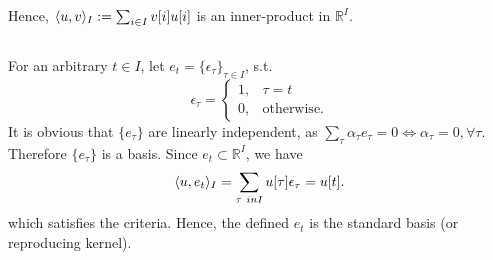 Hence, $\langle u, v \rangle_I := \sum_{i \in I} v[i]u[i]$ is an inner-product in $\mathbb{R}^I$.

\subsection{}\label{subsec:p4-f}
For an arbitrary $t \in I$, let $e_t = \{\epsilon_\tau\}_{\tau \in I}$, s.t.
\[
\epsilon_\tau = \begin{cases}
1, &\tau = t\\
0, &\text{otherwise}.
\end{cases}
\]
It is obvious that $\{e_\tau\}$ are linearly independent, as $\sum_{\tau} \alpha_\tau e_\tau = 0 \Leftrightarrow \alpha_\tau =0, \forall \tau$. Therefore $\{e_\tau\}$ is a basis. Since $e_t \subset \mathbb{R}^I$, we have
\[\innerprod{u}{e_t}_I = \sum_{\tau \ in I} u[\tau] \epsilon_\tau = u[t].\]
which satisfies the criteria. Hence, the defined $e_t$ is the standard basis (or reproducing kernel).
